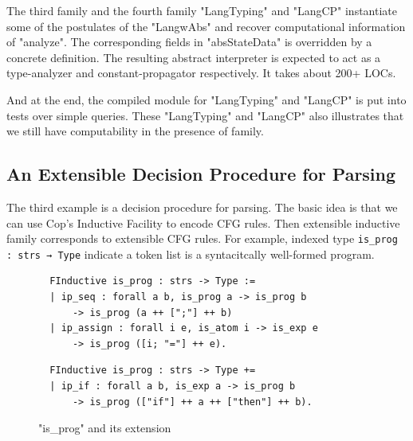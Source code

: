 The third family and the fourth family "LangTyping" and "LangCP" instantiate some of the postulates of the
"LangwAbs" and recover computational information of "analyze". The corresponding fields in "absStateData" is overridden by a concrete definition. The resulting abstract interpreter is expected
to act as a type-analyzer and constant-propagator respectively. It takes about 200+ LOCs. 


And at the end, the compiled module for "LangTyping" and "LangCP" is put into tests over simple queries. These "LangTyping" and "LangCP" also illustrates that we still have
computability in the presence of family.

\subsection{An Extensible Decision Procedure for Parsing}
The third example is a decision procedure for parsing. The basic idea is that we can use Cop's Inductive Facility to encode CFG rules. Then extensible inductive family corresponds to extensible CFG rules. For example, indexed type \texttt{is_prog : strs → Type} indicate a token list is a syntacitcally well-formed program.

\begin{figure}[!htb]
  
  \begin{minipage}{\textwidth}
  \begin{multicols}{2}
  

  
  \begin{lstlisting}
  FInductive is_prog : strs -> Type := 
  | ip_seq : forall a b, is_prog a -> is_prog b 
      -> is_prog (a ++ [";"] ++ b) 
  | ip_assign : forall i e, is_atom i -> is_exp e 
      -> is_prog ([i; "="] ++ e).  
  \end{lstlisting}
  
  
  \columnbreak
  
  \begin{lstlisting}
  FInductive is_prog : strs -> Type += 
  | ip_if : forall a b, is_exp a -> is_prog b 
      -> is_prog (["if"] ++ a ++ ["then"] ++ b). 
  \end{lstlisting}
  
  
  
  
  \end{multicols}
  \end{minipage}
  \caption{"is_prog" and its extension}
  \end{figure}

